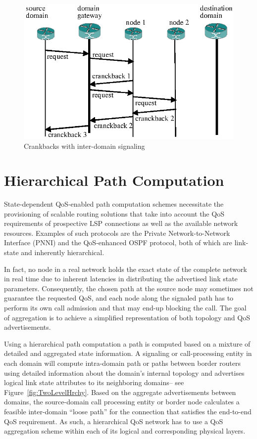\begin{figure}[t]
\centering
\includegraphics{Figures/crankback.eps}
\caption{Crankbacks with inter-domain signaling}
\label{fig:crankback}
\end{figure}

\section{Hierarchical Path Computation}
State-dependent QoS-enabled path computation schemes necessitate the provisioning of scalable routing solutions that take into account the QoS requirements of prospective LSP connections as well as the available network resources. Examples of such protocols are the Private Network-to-Network Interface (PNNI) and the QoS-enhanced OSPF protocol, both of which are link-state and inherently hierarchical.

In fact, no node in a real network holds the exact state of the complete network in real time due to inherent latencies in distributing the advertised link state parameters. Consequently, the chosen path at the source node may sometimes not guarantee the requested QoS, and each node along the signaled path has to perform its own call admission and that may end-up blocking the call. The goal of aggregation is to achieve a simplified representation of both topology and QoS advertisements.

Using a hierarchical path computation a path is computed based on a mixture of detailed and aggregated state information. A signaling or call-processing entity in each domain will compute intra-domain path or paths between border routers using detailed information about the domain's internal topology and advertises logical link state attributes to its neighboring domains-- see Figure~\ref{fig:TwoLevelHrchy}. Based on the aggregate advertisements between domains, the source-domain call processing entity or border node calculates a feasible inter-domain ``loose path'' for the connection that satisfies the end-to-end QoS requirement. As such, a hierarchical QoS network has to use a QoS aggregation scheme within each of its logical and corresponding physical layers.

